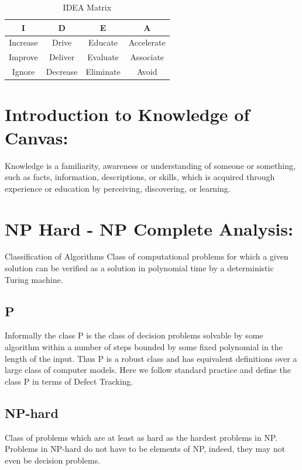 \documentclass[a4paper,12pt]{report}
\begin{document}
\begin{itemize}
\begin{itemize}
\begin{table}[!htbp]
\begin{center}
  \begin{tabular}{| c | c | c | c |}
\hline
 I & D & E & A \\ 
\hline
Increase & Drive & Educate & Accelerate \\
\hline
Improve & Deliver & Evaluate & Associate  \\
 \hline
Ignore & Decrease & Eliminate & Avoid \\
\hline
\end{tabular}
 \caption { IDEA Matrix }
 \label{tab:imatrix}
\end{center}
\end{table}
\section{Introduction to Knowledge of Canvas:}

Knowledge is a familiarity, awareness or understanding of someone or something,
such as facts, information, descriptions, or skills, which is acquired through
experience or education by perceiving, discovering, or learning.


\section {NP Hard - NP Complete Analysis:}
Classification of Algorithms
Class of computational problems for which a given solution can be verified as a solution in polynomial time by a deterministic Turing machine.
\subsection {P}
Informally the class P is the class of decision problems solvable by some algorithm within a number of steps bounded by some fixed polynomial in the length of the input.
Thus P is a robust class and has equivalent definitions over a large class of computer models. Here we follow standard practice and define the class P in terms of Defect Tracking.
	
	
\subsection { NP-hard}
Class of problems which are at least as hard as the hardest problems in NP. Problems in NP-hard do not have to be elements of NP, indeed, they may not even be decision problems.



\end{itemize}
\end{itemize}
\end{document}

